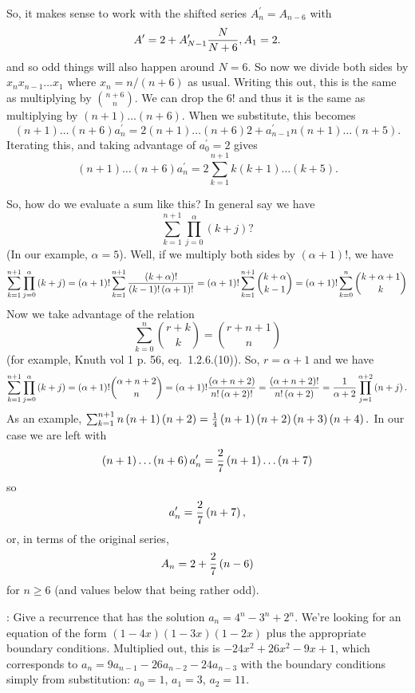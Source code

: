 So, it makes sense to work with the shifted series $A^{\prime}_n = A_{n-6}$
with
$$
 A^{\prime} = 2 + A^{\prime}_{N-1} {N \over N + 6}, A_1 = 2 .
$$
and so odd things will also happen around $N = 6$.  
So now we divide both sides by $x_n x_{n-1} \ldots x_1$ where
$x_n = n / \left(n + 6\right)$ as usual.  Writing this out, this is 
the same as multiplying by $n + 6 \choose n$.  We can drop the $6!$
and thus it is the same as multiplying by $\left(n + 1\right)\ldots\left(n+6\right)$.
When we substitute, this becomes
$$
 \left(n+1\right)\ldots\left(n+6\right) a^{\prime}_n = 2 \left(n+1\right)\ldots
 \left(n+6\right) 2 + a^{\prime}_{n-1} n \left(n+1\right)\ldots\left(n+5\right).
$$
Iterating this, and taking advantage of $a^{\prime}_0 = 2$ gives
$$
\left(n+1\right)\ldots\left(n+6\right) a^{\prime}_n = 2 \sum_{k=1}^{n+1}
k \left(k + 1\right)\ldots\left(k+5\right).
$$

So, how do we evaluate a sum like this?  In general say we have
$$
 \sum_{k=1}^{n+1} \prod_{j=0}^{\alpha} \left(k + j\right)?
$$
(In our example, $\alpha = 5$).  Well, if we multiply both sides by 
$\left(\alpha + 1\right) !$, we have
$$
 \sum_{k=1}^{n+1} \prod_{j=0}^{\alpha} \left(k + j\right) =
 \left(\alpha + 1\right)! \sum_{k=1}^{n+1} {\left(k + \alpha\right)!
   \over \left(k - 1\right)! \left(\alpha + 1\right)!} =
    \left(\alpha + 1\right)! \sum_{k=1}^{n+1} {k + \alpha \choose k - 1}
     = \left(\alpha + 1\right)! \sum_{k=0}^{n} {k + \alpha + 1 \choose k}
$$
Now we take advantage of the relation
$$
 \sum_{k=0}^n {r + k \choose k} = {r + n + 1 \choose n}
$$
(for example, Knuth vol 1 p. 56, eq.~1.2.6.(10)).  So, $r=\alpha + 1$
and we have
$$
  \sum_{k=1}^{n+1} \prod_{j=0}^{\alpha} \left(k + j\right) =
  \left(\alpha + 1\right)! {\alpha + n + 2 \choose n} =
  \left(\alpha + 1\right)! {\left(\alpha + n + 2\right) \over n! \left(\alpha + 2\right)!} =
  { \left(\alpha + n + 2\right)! \over n! \left(\alpha + 2\right)}
  = {1 \over \alpha + 2} \prod_{j=1}^{\alpha + 2} \left(n + j\right).
$$
As an example, $\sum_{k=1}^{n+1} n \left(n + 1\right) \left(n + 2\right)
 = {1 \over 4} \left(n + 1\right)\left(n + 2\right) \left(n + 3\right) \left(n + 4\right).$
 In our case we are left with
$$
\left(n+1\right)\ldots\left(n+6\right) a^{\prime}_n = {2 \over 7}
\left(n + 1\right) \ldots \left(n + 7\right)
$$
so
$$ 
 a^{\prime}_n = {2 \over 7} \left(n + 7\right),
$$
or, in terms of the original series,
$$
 A_n  = 2 + {2 \over 7} \left(n - 6\right)
$$
for $n \ge 6$ (and values below that being rather odd).

\vskip 0.08in : Give a recurrence
that has the solution $a_n = 4^n - 3^n + 2^n$.\hfil\break
We're looking for an equation of the form $\left(1 - 4 x\right)
\left(1 - 3 x\right) \left(1 - 2 x\right)$ plus the appropriate boundary
conditions.  Multiplied out, this is $-24 x^2 + 26 x^2 - 9 x + 1$,
which corresponds to $a_n = 9 a_{n-1} - 26 a_{n-2} - 24 a_{n-3}$
with the boundary conditions simply from substitution: $a_0 = 1$,
$a_1 = 3$, $a_2 = 11$.

